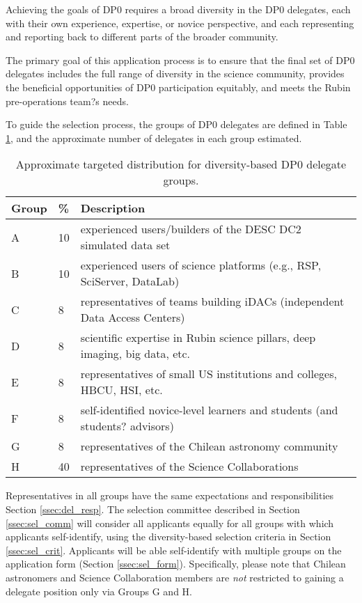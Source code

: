 \documentclass[DM,authoryear,toc]{lsstdoc}
\begin{document}
Achieving the goals of DP0 requires a broad diversity in the DP0 delegates, each with their own experience, expertise, or novice perspective, and each representing and reporting back to different parts of the broader community.

The primary goal of this application process is to ensure that the final set of DP0 delegates includes the full range of diversity in the science community, provides the beneficial opportunities of DP0 participation equitably, and meets the Rubin pre-operations team?s needs.

To guide the selection process, the groups of DP0 delegates are defined in Table \ref{tab:delegate_groups}, and the approximate number of delegates in each group estimated.

\begin{table}
\centering
\caption{Approximate targeted distribution for diversity-based DP0 delegate groups.}\label{tab:delegate_groups}
\begin{tabular}{lll}
\hline
Group & \% & Description \\
\hline \hline
A & 10 & experienced users/builders of the DESC DC2 simulated data set \\
B & 10 & experienced users of science platforms (e.g., RSP, SciServer, DataLab) \\
C & 8 & representatives of teams building iDACs (independent Data Access Centers) \\
D & 8 & scientific expertise in Rubin science pillars, deep imaging, big data, etc. \\
E & 8 & representatives of small US institutions and colleges, HBCU, HSI, etc. \\
F & 8 & self-identified novice-level learners and students (and students? advisors) \\
G & 8 & representatives of the Chilean astronomy community \\
H & 40 & representatives of the Science Collaborations \\
\hline
\end{tabular}
\end{table}

Representatives in all groups have the same expectations and responsibilities Section \ref{ssec:del_resp}.
The selection committee described in Section \ref{ssec:sel_comm} will consider all applicants equally for all groups with which applicants self-identify, using the diversity-based selection criteria in Section \ref{ssec:sel_crit}.
Applicants will be able self-identify with multiple groups on the application form (Section \ref{ssec:sel_form}).
Specifically, please note that Chilean astronomers and Science Collaboration members are {\it not} restricted to gaining a delegate position only via Groups G and H.
\end{document}
